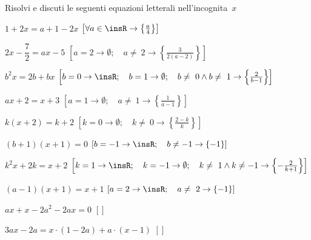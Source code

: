 \subsubsection*{}

\begin{esercizio}[\Ast]
\label{ese:20.34}
Risolvi e discuti le seguenti equazioni letterali nell'incognita~\(x\)
\begin{enumeratea}
 \item \(1+2x=a+1-2x\)
\hfill \(\left[\forall a\in \insR \rightarrow \left\{\frac{a}{4}\right\}\right]\)
 \item \(2x-\dfrac{7}{2}=ax-5\)
\hfill \(\left[a=2 \rightarrow \emptyset; \quad a \neq~2 \rightarrow 
              \left\{\frac{3}{2(a-2)}\right\}\right]\)
 \item \(b^{2}x=2b+bx\)
\hfill \(\left[b=0 \rightarrow \insR; \quad 
              b=1\rightarrow\emptyset; \quad 
              b\neq~0\wedge b\neq~1\rightarrow \left\{\frac{2}{b-1}\right\}
        \right]\)
 \item \(ax+2=x+3\)
\hfill \(\left[a=1\rightarrow \emptyset; \quad 
              a\neq~1\rightarrow \left\{\frac{1}{a-1}\right\}\right]\)
 \item \(k(x+2)=k+2\)
\hfill \(\left[k=0 \rightarrow \emptyset; \quad k\neq~0 \rightarrow 
\left\{\frac{2-k}{k}\right\}\right]\)
 \item \((b+1)(x+1)=0\)
\hfill \(\left[b=-1 \rightarrow \insR; \quad b\neq -1 \rightarrow 
\left\{-1\right\}\right]\)
 \item \(k^{2}x+2k=x+2\)
\hfill \(\left[k=1 \rightarrow \insR; \quad k=-1 \rightarrow 
\emptyset; \quad k\neq~1\wedge k\neq -1 \rightarrow 
\left\{-{\frac{2}{k+1}}\right\}\right]\)
 \item \((a-1)(x+1)=x+1\)
\hfill \(\left[a=2 \rightarrow \insR; \quad a\neq~2 \rightarrow 
\left\{-1\right\}\right]\)
 \item \(ax+x-2a^{2}-2ax=0\)
  \hfill \(\left[\right]\)
 \item \(3ax-2a=x\cdot (1-2a)+a\cdot (x-1)\)
  \hfill \(\left[\right]\)

\end{enumeratea}
\end{esercizio}
